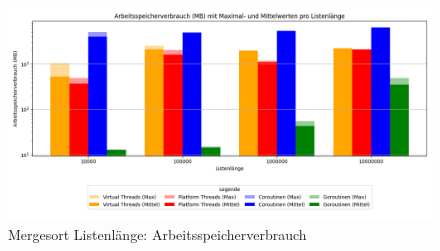 \documentclass[fontsize=12pt,paper=a4,twoside=semi,parskip=half-,headsepline,headinclude]{scrreprt}
\begin{document}
\begin{figure}[H]
	\centering
	\includegraphics[scale=0.5]{figures/mergesort/Listenlaenge/memory_usage_bar_plot.png}
	\caption{Mergesort Listenlänge: Arbeitsspeicherverbrauch}
	\label{fig:mslaengeRAM}
\end{figure}
\end{document}
